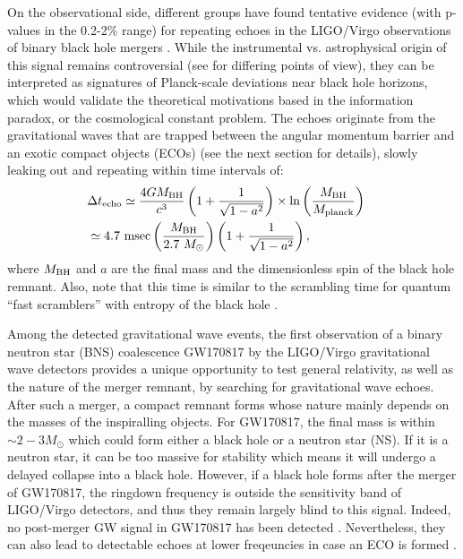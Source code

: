 \documentclass[a4paper,11pt]{article}
\begin{document}
On the observational side, different groups have found tentative evidence (with p-values in the 0.2-2\% range) for repeating echoes in the LIGO/Virgo observations of binary black hole mergers \cite{Abedi:2016hgu,Conklin:2017lwb,Westerweck:2017hus}. While the instrumental vs. astrophysical origin of this signal remains controversial (see \cite{Ashton:2016xff, Westerweck:2017hus, Abedi:2017isz, Abedi:2018pst} for differing points of view), they can be interpreted as signatures of Planck-scale deviations near black hole horizons, which would validate the theoretical motivations based in the information paradox, or the cosmological constant problem. The echoes originate from the gravitational waves that are trapped between the angular momentum barrier and an exotic compact objects (ECOs) \cite{Cardoso:2016rao,Cardoso:2016oxy, Wang:2018gin} (see the next section for details), slowly leaking out and repeating within time intervals of:
\begin{eqnarray}
&\Delta t_{\rm echo} \simeq \frac{4 G M_{\rm BH}}{c^3}\left(1+\frac{1}{\sqrt{1-a^2}}\right) \times \ln\left(M_{\rm BH} \over M_{\rm planck}\right)& \nonumber\\ &\simeq 4.7~ {\rm msec} \left(M_{\rm BH} \over 2.7~ M_\odot \right) \left(1+\frac{1}{\sqrt{1-a^2}}\right),& \label{delay}
\end{eqnarray}
where $M_{\rm BH}$ and $a$ are the final mass and the dimensionless spin of the black hole remnant. Also, note that this time is similar to the scrambling time for quantum ``fast scramblers''  with entropy of the black hole  \cite{Hayden:2007cs, Sekino:2008he}. 


Among the detected gravitational wave events, the first observation of a binary neutron star (BNS) coalescence GW170817 by the LIGO/Virgo gravitational wave detectors \cite{TheLIGOScientific:2017qsa,Abbott:2017dke} provides a unique opportunity to test general relativity, as well as the nature of the merger remnant, by searching for gravitational wave echoes.  
 After such a merger, a compact remnant forms whose nature mainly depends on the masses of the inspiralling objects. For GW170817, the final mass is within $\sim 2-3 M_{\odot}$ which could form either a black hole or a neutron star (NS). If it is a neutron star, it can be too massive for stability which means it will undergo a delayed collapse into a black hole. However, if a  black hole forms after the merger of GW170817, the ringdown frequency is outside the sensitivity band of LIGO/Virgo detectors, and thus they remain largely blind to this signal. Indeed, no post-merger GW signal in GW170817 has been detected \cite{Abbott:2017dke}. Nevertheless,  they can also lead to detectable echoes at lower freqeuncies in case an ECO is formed \cite{Cardoso:2016oxy}.
\end{document}
